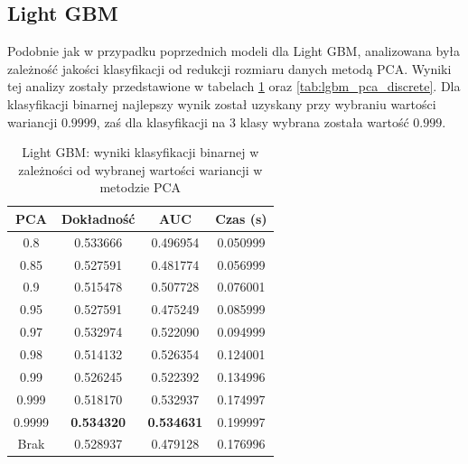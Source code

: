 \documentclass[a4paper, twoside, 11pt, openright]{article}
\begin{document}
\subsection{Light GBM}

Podobnie jak w przypadku poprzednich modeli dla Light GBM, analizowana była zależność jakości klasyfikacji od redukcji rozmiaru danych metodą PCA. Wyniki tej analizy zostały przedstawione w tabelach \ref{tab:lgbm_pca_binary} oraz \ref{tab:lgbm_pca_discrete}. Dla klasyfikacji binarnej najlepszy wynik został uzyskany przy wybraniu wartości wariancji $0.9999$, zaś dla klasyfikacji na 3 klasy wybrana została wartość $0.999$.	

\begin{table}[H]
    \centering
    \begin{tabular}{|c|c|c|c|}
    \hline
        \textbf{PCA} & \textbf{Dokładność} & \textbf{AUC} & \textbf{Czas (s)} \\ \hline
0.8                &  0.533666 &  0.496954 &    0.050999 \\ \hline
0.85               &  0.527591 &  0.481774 &    0.056999 \\ \hline
0.9                &  0.515478 &  0.507728 &    0.076001 \\ \hline
0.95               &  0.527591 &  0.475249 &    0.085999 \\ \hline
0.97               &  0.532974 &  0.522090 &    0.094999 \\ \hline
0.98               &  0.514132 &  0.526354 &    0.124001 \\ \hline
0.99               &  0.526245 &  0.522392 &    0.134996 \\ \hline
0.999			   &  0.518170 &  0.532937 &    0.174997 \\ \hline
0.9999             &  \textbf{0.534320} &  \textbf{0.534631} &    0.199997 \\ \hline
Brak                &  0.528937 &  0.479128 &    0.176996 \\ \hline
    \end{tabular}
    \caption{Light GBM: wyniki klasyfikacji binarnej w zależności od wybranej wartości wariancji w metodzie PCA}
    \label{tab:lgbm_pca_binary}
\end{table}
\end{document}
